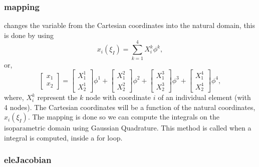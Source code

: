 \documentclass[11pt, a4paper]{article}
\numberwithin{equation}{section}
\begin{document}
\subsubsection*{mapping} changes the variable from the Cartesian coordinates into the natural domain, this is done by using
\begin{equation*}
x_i(\xi_I) = \sum_{k=1}^4 X^k_i \phi^k,
\end{equation*}
or,
\begin{equation*}
\begin{bmatrix}
x_1 \\[.2cm]
x_2
\end{bmatrix} = \begin{bmatrix}
X^1_1 \\[.2cm]
X^1_2
\end{bmatrix} \phi^1 +
\begin{bmatrix}
X^2_1 \\[.2cm]
X^2_2
\end{bmatrix} \phi^2 +
\begin{bmatrix}
X^3_1 \\[.2cm]
X^3_2
\end{bmatrix} \phi^3+
\begin{bmatrix}
X^4_1 \\[.2cm]
X^4_2
\end{bmatrix} \phi^4,
\end{equation*}
where, $X^k_i$ represent the $k$ node with coordinate $i$ of an individual element (with 4 nodes). The Cartesian coordinates will be a function of the natural coordinates, $x_i(\xi_I)$. The mapping is done so we can compute the integrals on the isoparametric domain using Gaussian Quadrature. This method is called when a integral is computed, inside a \textsf{for} loop.

\subsubsection*{eleJacobian}
\end{document}
